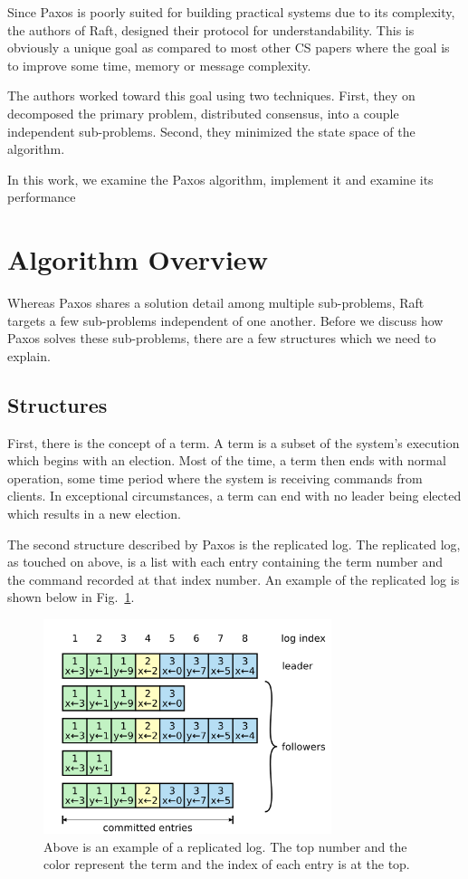 Since Paxos is poorly suited for building practical systems due to its complexity, the authors of Raft, designed their protocol for understandability.
This is obviously a unique goal as compared to most other CS papers where the goal is to improve some time, memory or message complexity.

The authors worked toward this goal using two techniques.
First, they on decomposed the primary problem, distributed consensus, into a couple independent sub-problems.
Second, they minimized the state space of the algorithm.

In this work, we examine the Paxos algorithm, implement it and examine its performance

\section{Algorithm Overview}

Whereas Paxos shares a solution detail among multiple sub-problems, Raft targets a few sub-problems independent of one another.
Before we discuss how Paxos solves these sub-problems, there are a few structures which we need to explain.

\subsection{Structures}
First, there is the concept of a term.
A term is a subset of the system's execution which begins with an election.
Most of the time, a term then ends with normal operation, some time period where the system is receiving commands from clients.
In exceptional circumstances, a term can end with no leader being elected which results in a new election.

The second structure described by Paxos is the replicated log.
The replicated log, as touched on above, is a list with each entry containing the term number and the command recorded at that index number.
An example of the replicated log is shown below in Fig.~\ref{fig:replicatedlog}.

\begin{figure}
    \centering{}
    \includegraphics[width=0.75\textwidth]{replicatedlog.png}
    \caption{\label{fig:replicatedlog}Above is an example of a replicated log. The top number and the color represent the term and the index of each entry is at the top.}
\end{figure}

